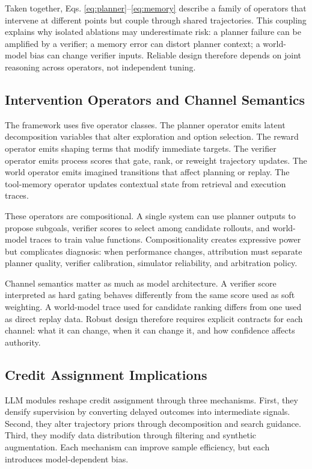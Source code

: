 ﻿\documentclass[conference]{IEEEtran}
\begin{document}
Taken together, Eqs. \eqref{eq:planner}--\eqref{eq:memory} describe a family of operators that intervene at different points but couple through shared trajectories. This coupling explains why isolated ablations may underestimate risk: a planner failure can be amplified by a verifier; a memory error can distort planner context; a world-model bias can change verifier inputs. Reliable design therefore depends on joint reasoning across operators, not independent tuning.

\subsection{Intervention Operators and Channel Semantics}
The framework uses five operator classes. The planner operator emits latent decomposition variables that alter exploration and option selection. The reward operator emits shaping terms that modify immediate targets. The verifier operator emits process scores that gate, rank, or reweight trajectory updates. The world operator emits imagined transitions that affect planning or replay. The tool-memory operator updates contextual state from retrieval and execution traces.

These operators are compositional. A single system can use planner outputs to propose subgoals, verifier scores to select among candidate rollouts, and world-model traces to train value functions. Compositionality creates expressive power but complicates diagnosis: when performance changes, attribution must separate planner quality, verifier calibration, simulator reliability, and arbitration policy.

Channel semantics matter as much as model architecture. A verifier score interpreted as hard gating behaves differently from the same score used as soft weighting. A world-model trace used for candidate ranking differs from one used as direct replay data. Robust design therefore requires explicit contracts for each channel: what it can change, when it can change it, and how confidence affects authority.

\subsection{Credit Assignment Implications}
LLM modules reshape credit assignment through three mechanisms. First, they densify supervision by converting delayed outcomes into intermediate signals. Second, they alter trajectory priors through decomposition and search guidance. Third, they modify data distribution through filtering and synthetic augmentation. Each mechanism can improve sample efficiency, but each introduces model-dependent bias.
\end{document}
